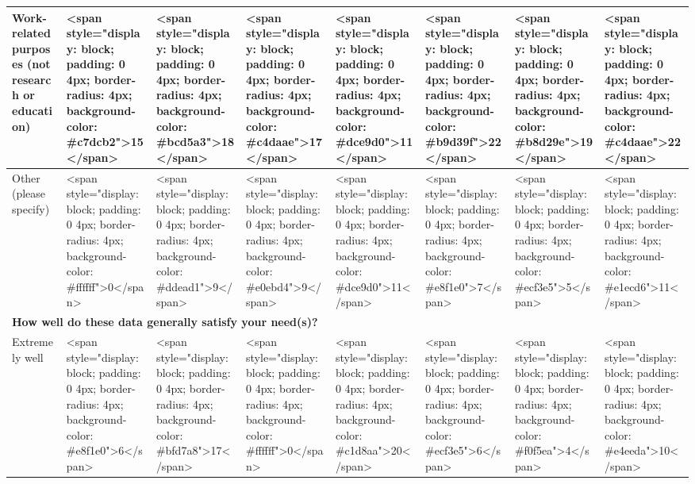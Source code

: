 \documentclass[
]{article}
\begin{document}
\begin{table}
\begin{tabular}[t]{l|l|l|l|l|l|l|l}
\hspace{1em}Work-related purposes (not research or education) & <span style="display: block; padding: 0 4px; border-radius: 4px; background-color: #c7dcb2">15</span> & <span style="display: block; padding: 0 4px; border-radius: 4px; background-color: #bcd5a3">18</span> & <span style="display: block; padding: 0 4px; border-radius: 4px; background-color: #c4daae">17</span> & <span style="display: block; padding: 0 4px; border-radius: 4px; background-color: #dce9d0">11</span> & <span style="display: block; padding: 0 4px; border-radius: 4px; background-color: #b9d39f">22</span> & <span style="display: block; padding: 0 4px; border-radius: 4px; background-color: #b8d29e">19</span> & <span style="display: block; padding: 0 4px; border-radius: 4px; background-color: #c4daae">22</span>\\
\hline
\hspace{1em}Other (please specify) & <span style="display: block; padding: 0 4px; border-radius: 4px; background-color: #ffffff">0</span> & <span style="display: block; padding: 0 4px; border-radius: 4px; background-color: #ddead1">9</span> & <span style="display: block; padding: 0 4px; border-radius: 4px; background-color: #e0ebd4">9</span> & <span style="display: block; padding: 0 4px; border-radius: 4px; background-color: #dce9d0">11</span> & <span style="display: block; padding: 0 4px; border-radius: 4px; background-color: #e8f1e0">7</span> & <span style="display: block; padding: 0 4px; border-radius: 4px; background-color: #ecf3e5">5</span> & <span style="display: block; padding: 0 4px; border-radius: 4px; background-color: #e1ecd6">11</span>\\
\hline
\multicolumn{8}{l}{\textbf{How well do these data generally satisfy your need(s)?}}\\
\hline
\hspace{1em}Extremely well & <span style="display: block; padding: 0 4px; border-radius: 4px; background-color: #e8f1e0">6</span> & <span style="display: block; padding: 0 4px; border-radius: 4px; background-color: #bfd7a8">17</span> & <span style="display: block; padding: 0 4px; border-radius: 4px; background-color: #ffffff">0</span> & <span style="display: block; padding: 0 4px; border-radius: 4px; background-color: #c1d8aa">20</span> & <span style="display: block; padding: 0 4px; border-radius: 4px; background-color: #ecf3e5">6</span> & <span style="display: block; padding: 0 4px; border-radius: 4px; background-color: #f0f5ea">4</span> & <span style="display: block; padding: 0 4px; border-radius: 4px; background-color: #e4eeda">10</span>\\

\end{tabular}
\end{table}
\end{document}
